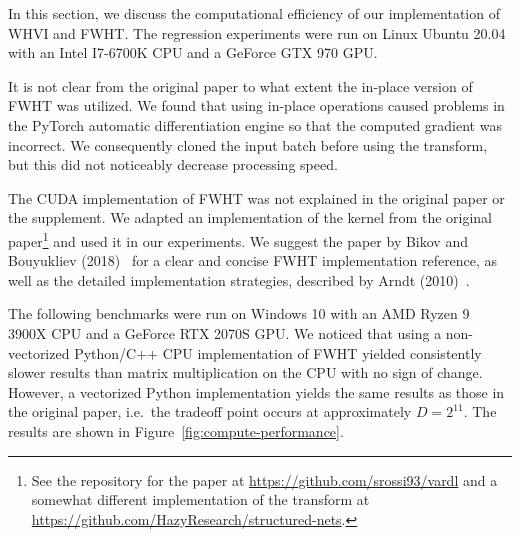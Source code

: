 
In this section, we discuss the computational efficiency of our implementation of WHVI and FWHT\@.
The regression experiments were run on Linux Ubuntu 20.04 with an Intel I7-6700K CPU and a GeForce GTX 970 GPU\@.

It is not clear from the original paper to what extent the in-place version of FWHT was utilized.
We found that using in-place operations caused problems in the PyTorch automatic differentiation engine so that the computed gradient was incorrect.
We consequently cloned the input batch before using the transform, but this did not noticeably decrease processing speed.

The CUDA implementation of FWHT was not explained in the original paper or the supplement.
We adapted an implementation of the kernel from the original paper\footnote{See the repository for the paper at \url{https://github.com/srossi93/vardl} and a somewhat different implementation of the transform at \url{https://github.com/HazyResearch/structured-nets}.} and used it in our experiments.
We suggest the paper by Bikov and Bouyukliev (2018)~\cite{bikov2018parallel} for a clear and concise FWHT implementation reference, as well as the detailed implementation strategies, described by Arndt (2010)~\cite{arndt2010matters}.

The following benchmarks were run on Windows 10 with an AMD Ryzen 9 3900X CPU and a GeForce RTX 2070S GPU\@.
We noticed that using a non-vectorized Python/C++ CPU implementation of FWHT yielded consistently slower results than matrix multiplication on the CPU with no sign of change.
However, a vectorized Python implementation yields the same results as those in the original paper, i.e.\ the tradeoff point occurs at approximately $D = 2^{11}$.
The results are shown in Figure~\ref{fig:compute-performance}.

